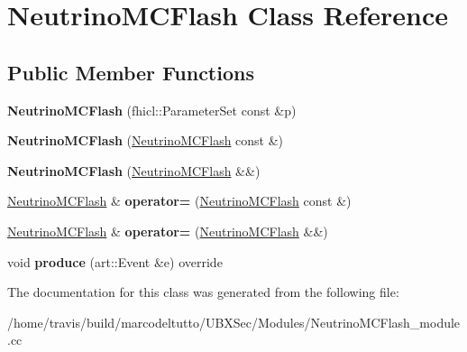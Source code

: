 \hypertarget{classNeutrinoMCFlash}{\section{\-Neutrino\-M\-C\-Flash \-Class \-Reference}
\label{classNeutrinoMCFlash}
}
\subsection*{\-Public \-Member \-Functions}
\begin{DoxyCompactItemize}
\item 
\hypertarget{classNeutrinoMCFlash_a924c91e62abb544113c57f337b792da0}{{\bfseries \-Neutrino\-M\-C\-Flash} (fhicl\-::\-Parameter\-Set const \&p)}\label{classNeutrinoMCFlash_a924c91e62abb544113c57f337b792da0}

\item 
\hypertarget{classNeutrinoMCFlash_a7d5c6482b7fe2e93af336474ee8fcce5}{{\bfseries \-Neutrino\-M\-C\-Flash} (\hyperlink{classNeutrinoMCFlash}{\-Neutrino\-M\-C\-Flash} const \&)}\label{classNeutrinoMCFlash_a7d5c6482b7fe2e93af336474ee8fcce5}

\item 
\hypertarget{classNeutrinoMCFlash_aff9006a646c5ab5adaaf7e856edb1576}{{\bfseries \-Neutrino\-M\-C\-Flash} (\hyperlink{classNeutrinoMCFlash}{\-Neutrino\-M\-C\-Flash} \&\&)}\label{classNeutrinoMCFlash_aff9006a646c5ab5adaaf7e856edb1576}

\item 
\hypertarget{classNeutrinoMCFlash_ac5dffc245c5f66a7622b5e5cb8c835f8}{\hyperlink{classNeutrinoMCFlash}{\-Neutrino\-M\-C\-Flash} \& {\bfseries operator=} (\hyperlink{classNeutrinoMCFlash}{\-Neutrino\-M\-C\-Flash} const \&)}\label{classNeutrinoMCFlash_ac5dffc245c5f66a7622b5e5cb8c835f8}

\item 
\hypertarget{classNeutrinoMCFlash_ad400da660762d0f8649fa868b13cc4e0}{\hyperlink{classNeutrinoMCFlash}{\-Neutrino\-M\-C\-Flash} \& {\bfseries operator=} (\hyperlink{classNeutrinoMCFlash}{\-Neutrino\-M\-C\-Flash} \&\&)}\label{classNeutrinoMCFlash_ad400da660762d0f8649fa868b13cc4e0}

\item 
\hypertarget{classNeutrinoMCFlash_a96fff468ffb1b1182b296d9bdab6d31b}{void {\bfseries produce} (art\-::\-Event \&e) override}\label{classNeutrinoMCFlash_a96fff468ffb1b1182b296d9bdab6d31b}

\end{DoxyCompactItemize}


\-The documentation for this class was generated from the following file\-:\begin{DoxyCompactItemize}
\item 
/home/travis/build/marcodeltutto/\-U\-B\-X\-Sec/\-Modules/\-Neutrino\-M\-C\-Flash\-\_\-module.\-cc\end{DoxyCompactItemize}
